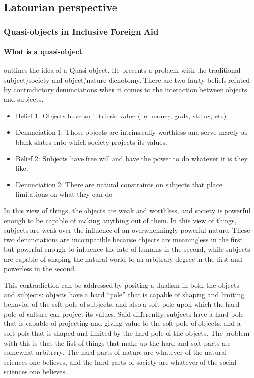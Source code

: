 \documentclass[a4paper]{article}
\begin{document}
\subsection{Latourian perspective}


\subsubsection{Quasi-objects in Inclusive Foreign Aid}

\paragraph{What is a quasi-object}

\cite{latour2012we} outlines the idea of a Quasi-object. He presents a problem
with the traditional subject/society and object/nature dichotomy. There are
two faulty beliefs refuted by contradictory denunciations when it comes to the
interaction between objects and subjects. 
%
\begin{itemize}
    \item[] Belief 1: Objects have an intrinsic value (i.e. money, gods,
        status, etc). 

    \item[] Denunciation 1: Those objects are intrinsically worthless and
        serve merely as blank slates onto which society projects its values.

    \item[] Belief 2: Subjects have free will and have the power to do whatever
        it is they like.

    \item[] Denunciation 2: There are natural constraints on subjects that
        place limitations on what they can do.  \end{itemize}
%
In this view of things, the objects are weak and worthless, and society is
powerful enough to be capable of making anything out of them.  In this view of
things, subjects are weak over the influence of an overwhelmingly powerful
nature.  These two denunciations are incompatible because objects are
meaningless in the first but powerful enough to influence the fate of humans
in the second, while subjects are capable of shaping the natural world to an
arbitrary degree in the first and powerless in the second. 

This contradiction can be addressed by positing a dualism in both the objects
and subjects: objects have a hard ``pole'' that is capable of shaping and
limiting behavior of the soft pole of subjects, and also a soft pole upon
which the hard pole of culture can project its values.  Said differently,
subjects have a hard pole that is capable of projecting and giving value to
the soft pole of objects, and a soft pole that is shaped and limited by the
hard pole of the objects.  The problem with this is that the list of things
that make up the hard and soft parts are somewhat arbitrary. The hard parts of
nature are whatever of the natural sciences one believes, and the hard parts
of society are whatever of the social sciences one believes. 
\end{document}
